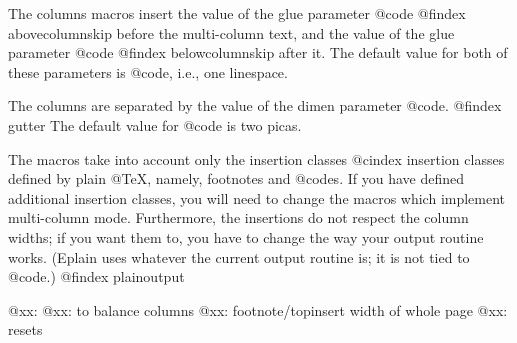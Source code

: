   The columns macros insert the value of the glue parameter
@code{\abovecolumnskip}
@findex abovecolumnskip
before the multi-column text, and the value of the glue parameter
@code{\belowcolumnskip}
@findex belowcolumnskip
after it.  The default value for both of these parameters is
@code{\bigskipamount}, i.e., one linespace.

  The columns are separated by the value of the dimen parameter
@code{\gutter}.
@findex gutter
The default value for @code{\gutter} is two picas.

  The macros take into account only the insertion classes
@cindex insertion classes
defined by plain @TeX{}, namely, footnotes and @code{\topinsert}s.  If
you have defined additional insertion classes, you will need to change
the macros which implement multi-column mode.  Furthermore, the insertions
do not respect the column widths; if you want them to, you have to
change the way your output routine works.  (Eplain uses whatever the
current output routine is; it is not tied to @code{\plainoutput}.)
@findex plainoutput

@xx: \columnfill 
@xx: \singlecolumn to balance columns
@xx: footnote/topinsert width of whole page
@xx: \vfootnote resets \parskip
